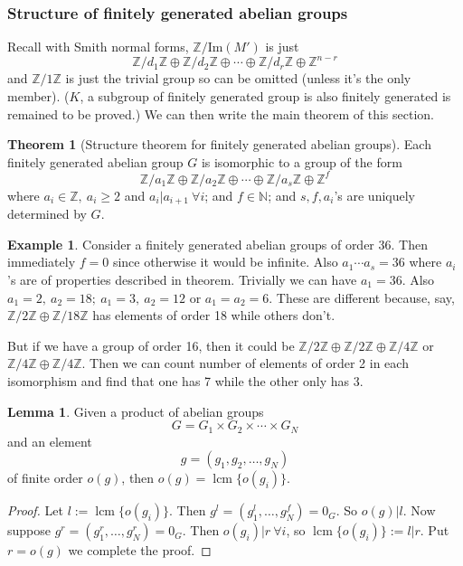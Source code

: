 \documentclass[a4paper]{article}
\newcommand{\lcm}{\operatorname{lcm}}
\theoremstyle{definition}
\newtheorem{thm}[defn]{Theorem}
\newtheorem{lemma}[defn]{Lemma}
\newtheorem{example}[defn]{Example}
\begin{document}
\subsubsection{Structure of finitely generated abelian groups}
Recall with Smith normal forms, $\mathbb Z/\text{Im}(M')$ is just
\[
\mathbb Z/d_1 \mathbb Z \oplus \mathbb Z/d_2 \mathbb Z \oplus \cdots \oplus \mathbb Z/d_r \mathbb Z \oplus \mathbb Z^{n-r}
\]
and $\mathbb Z/1\mathbb Z$ is just the trivial group so can be omitted (unless it's the only member). ($K$, a subgroup of finitely generated group is also finitely generated is remained to be proved.) We can then write the main theorem of this section.
\begin{thm}[Structure theorem for finitely generated abelian groups]
Each finitely generated abelian group $G$ is isomorphic to a group of the form
\[
\mathbb Z/a_1 \mathbb Z \oplus \mathbb Z/a_2 \mathbb Z \oplus \cdots \oplus \mathbb Z/a_s \mathbb Z \oplus \mathbb Z^f
\]
where $a_i \in \mathbb Z,\ a_i \geq 2$ and $a_i|a_{i+1} \ \forall i$; and $f\in \mathbb N$; and $s,f,a_i$'s are uniquely determined by $G$.
\end{thm}
\begin{example}
Consider a finitely generated abelian groups of order 36. Then immediately $f=0$ since otherwise it would be infinite. Also $a_1\cdots a_s=36$ where $a_i$'s are of properties described in theorem. Trivially we can have $a_1=36$. Also $a_1=2,\ a_2=18;\ a_1=3,\ a_2=12$ or $a_1=a_2=6$. These are different because, say, $\mathbb Z/2\mathbb Z \oplus \mathbb Z/18\mathbb Z$ has elements of order 18 while others don't.

But if we have a group of order 16, then it could be $\mathbb Z/2\mathbb Z \oplus \mathbb Z/2\mathbb Z \oplus \mathbb Z/4\mathbb Z$ or $\mathbb Z/4\mathbb Z\oplus \mathbb Z/4\mathbb Z$. Then we can count number of elements of order 2 in each isomorphism and find that one has 7 while the other only has 3.
\end{example}
\begin{lemma}
Given a product of abelian groups
\[
G=G_1 \times G_2 \times \cdots \times G_N
\]
and an element
\[
g=(g_1,g_2,\ldots,g_N)
\]
of finite order $o(g)$, then $o(g)=\lcm \{o(g_i)\}$.
\end{lemma}
\begin{proof}
Let $l:=\lcm \{o(g_i)\}$. Then $g^l = \left(g_1^l,\ldots,g_N^f \right)=0_G$. So $o(g)|l$. Now suppose $g^r = \left(g_1^r,\ldots,g_N^r \right)=0_G$. Then $o(g_i)|r \ \forall i$, so $\lcm \{o(g_i)\} :=l |r$. Put $r=o(g)$ we complete the proof.
\end{proof}
\end{document}
